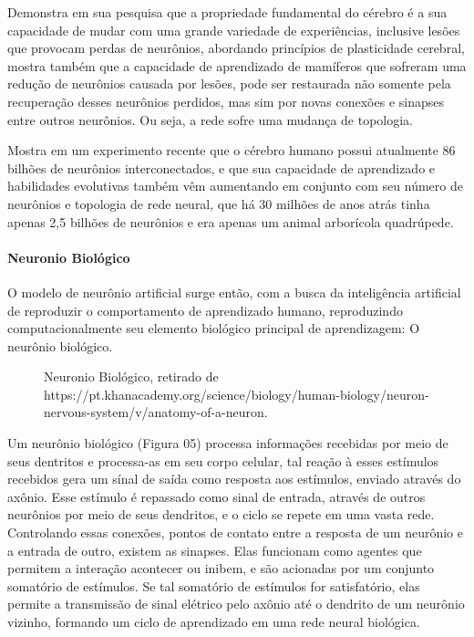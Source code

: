 \documentclass[	12pt, Times, openright, twoside, a4paper, english, brazil]{abntex2}
\begin{document}
            \cite{Muhammad2014} Demonstra em sua pesquisa que a propriedade fundamental do cérebro é a sua capacidade de mudar com uma grande variedade de experiências, inclusive lesões que provocam perdas de neurônios, abordando princípios de plasticidade cerebral, mostra também que a capacidade de aprendizado de mamíferos que sofreram uma redução de neurônios causada por lesões, pode ser restaurada não somente pela recuperação desses neurônios perdidos, mas sim por novas conexões e sinapses entre outros neurônios. Ou seja, a rede sofre uma mudança de topologia.

            \cite{Fapesp192} Mostra em um experimento recente que o cérebro humano possui atualmente 86 bilhões de neurônios interconectados, e que sua capacidade de aprendizado e habilidades evolutivas também vêm aumentando em conjunto com seu número de neurônios e topologia de rede neural, que há 30 milhões de anos atrás tinha apenas 2,5 bilhões de neurônios e era apenas um animal arborícola quadrúpede.

          \paragraph*{Neuronio Biológico}
            O modelo de neurônio artificial surge então, com a busca da inteligência artificial de reproduzir o comportamento de aprendizado humano, reproduzindo computacionalmente seu elemento biológico principal de aprendizagem: O neurônio biológico. 
            \begin{figure}[!ht]
              \caption{Neuronio Biológico, retirado de https://pt.khanacademy.org/science/biology/human-biology/neuron-nervous-system/v/anatomy-of-a-neuron.\label{fig:NeuronioBiológico}}
            \end{figure}
            Um neurônio biológico (Figura 05) processa informações recebidas por meio de seus dentritos e processa-as em seu corpo celular, tal reação à esses estímulos recebidos gera um sínal de saída como resposta aos estímulos, enviado através do axônio. Esse estímulo é repassado como sinal de entrada, através de outros neurônios por meio de seus dendritos, e o ciclo se repete em uma vasta rede.
            Controlando essas conexões, pontos de contato entre a resposta de um neurônio e a entrada de outro, existem as sinapses. Elas funcionam como agentes que permitem a interação acontecer ou inibem, e são acionadas por um conjunto somatório de estímulos. Se tal somatório de estímulos for satisfatório, elas permite a transmissão de sinal elétrico pelo axônio até o dendrito de um neurônio vizinho, formando um ciclo de aprendizado em uma rede neural biológica.
\end{document}
